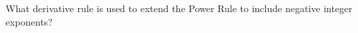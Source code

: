 \documentclass{ximera}
\author{Gregory Hartman \and Matthew Carr}
\begin{document}
\begin{exercise}




What derivative rule is used to extend the Power Rule to include negative integer exponents?

\begin{prompt}
\begin{multipleChoice}
\end{multipleChoice}
\end{prompt}
\end{exercise}
\end{document}
